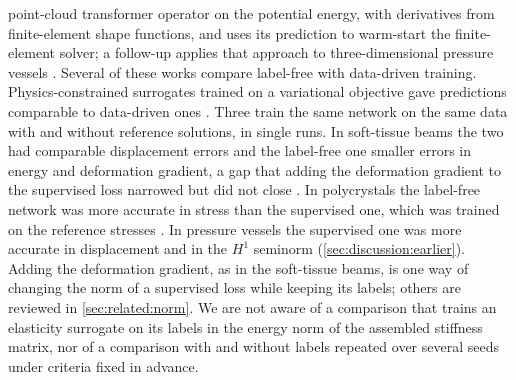 point-cloud transformer operator on the potential energy, with derivatives from finite-element shape functions, and uses its
prediction to warm-start the finite-element solver; a follow-up applies that approach to
three-dimensional pressure vessels \cite{Sun2026FEVessel}. Several of these works compare
label-free with data-driven training. Physics-constrained surrogates trained on a
variational objective gave predictions comparable to data-driven ones \cite{Zhu2019}. Three
train the same network on the same data with and without reference solutions, in single
runs. In soft-tissue beams the two had comparable displacement errors and the label-free one
smaller errors in energy and deformation gradient, a gap that adding the deformation
gradient to the supervised loss narrowed but did not close \cite{Dalton2023}. In polycrystals the label-free network was more
accurate in stress than the supervised one, which was trained on the reference stresses
\cite{MonteiroFernandes2025}. In pressure vessels the supervised one was more accurate in displacement and in the $H^1$ seminorm
\cite{Sun2026FEVessel} (\cref{sec:discussion:earlier}). Adding the deformation gradient, as in the
soft-tissue beams, is one way of changing the norm of a supervised loss while keeping its
labels; others are reviewed in \cref{sec:related:norm}. We are not aware of a comparison
that trains an elasticity surrogate on its labels in the energy norm of the assembled
stiffness matrix, nor of a comparison with and without labels repeated over several seeds
under criteria fixed in advance.

